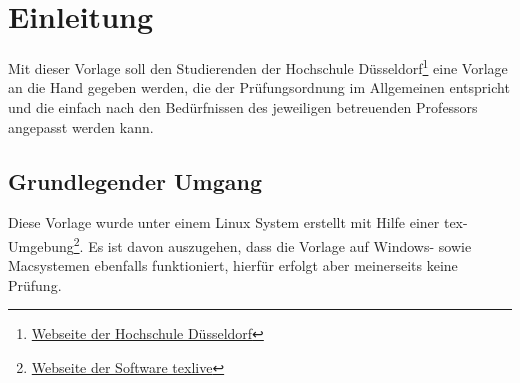 \newpage
\section{Einleitung}
Mit dieser Vorlage soll den Studierenden der Hochschule Düsseldorf\footnote{\href{https://www.hs-duesseldorf.de}{Webseite der Hochschule Düsseldorf}} eine Vorlage an die Hand gegeben werden, die der Prüfungsordnung im Allgemeinen entspricht und die einfach nach den Bedürfnissen des jeweiligen betreuenden Professors angepasst werden kann.

\subsection{Grundlegender Umgang}
Diese Vorlage wurde unter einem Linux System erstellt mit Hilfe einer tex-Umgebung\footnote{\href{https://tug.org/texlive/}{Webseite der Software texlive}}. Es ist davon auszugehen, dass die Vorlage auf Windows- sowie Macsystemen ebenfalls funktioniert, hierfür erfolgt aber meinerseits keine Prüfung.
